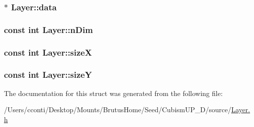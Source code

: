 \subsubsection[{data}]{$\ast$ Layer\+::data}\label{struct_layer_ab85c711ae2d70e26fb05644abd588c50}
\hypertarget{struct_layer_ab937eda50c83c45e9bc814f6be6abb46}{}
\subsubsection[{n\+Dim}]{\setlength{\rightskip}{0pt plus 5cm}const int Layer\+::n\+Dim}\label{struct_layer_ab937eda50c83c45e9bc814f6be6abb46}
\hypertarget{struct_layer_a4904db3e1890920dd364930bb68efa07}{}
\subsubsection[{size\+X}]{\setlength{\rightskip}{0pt plus 5cm}const int Layer\+::size\+X}\label{struct_layer_a4904db3e1890920dd364930bb68efa07}
\hypertarget{struct_layer_a7ec60475ab6fdf004e5ed4be01b1a318}{}
\subsubsection[{size\+Y}]{\setlength{\rightskip}{0pt plus 5cm}const int Layer\+::size\+Y}\label{struct_layer_a7ec60475ab6fdf004e5ed4be01b1a318}


The documentation for this struct was generated from the following file\+:\begin{DoxyCompactItemize}
\item 
/\+Users/cconti/\+Desktop/\+Mounts/\+Brutus\+Home/\+Seed/\+Cubism\+U\+P\+\_\+D/source/\hyperlink{_layer_8h}{Layer.\+h}\end{DoxyCompactItemize}
